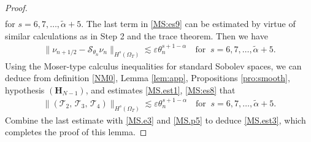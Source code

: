 \documentclass[twoside,11pt]{article}
\numberwithin{equation}{section}
\begin{document}
\begin{proof}
\begin{align*}
	\end{align*}
	for $s =6,7,\ldots, \widetilde{\alpha}+{5}$.
	The last term in \eqref{MS:es9} can be estimated by
	virtue of similar calculations as in Step 2 and the trace theorem. Then
	we have
	\begin{align}
		\|\nu_{n+1/2}-\mathcal{S}_{\theta_{{n}}}\nu_{n}\|_{H^{s}(\Omega_{T})}
		\lesssim \varepsilon \theta_{{n}}^{s+1-{\alpha }}
		\quad \textrm{for }\ s =6,7,\ldots, \widetilde{\alpha}+{5}.		
		\label{MS:es8}
	\end{align}
	Using the Moser-type calculus inequalities for standard Sobolev spaces, %
	we can deduce from definition \eqref{NM0}, Lemma \ref{lem:app}, Propositions \ref{pro:smooth}, hypothesis $(\mathbf{H}_{{N}-1})$, and estimates \eqref{MS.est1}, \eqref{MS:es8} that
	\begin{align}
		\|(\mathcal{T}_2,\, \mathcal{T}_3, \, \mathcal{T}_4)\|_{H^{s}(\Omega_{T})}
		\lesssim \varepsilon \theta_n^{s+1-{\alpha }}
		\quad \textrm{for }\ s =6,7,\ldots, \widetilde{\alpha}+{5}.	
		\nonumber
	\end{align}	
	Combine the last estimate with \eqref{MS.e3} and \eqref{MS.p5} to deduce \eqref{MS.est3}, which completes the proof of this lemma.
\end{proof}
\end{document}
